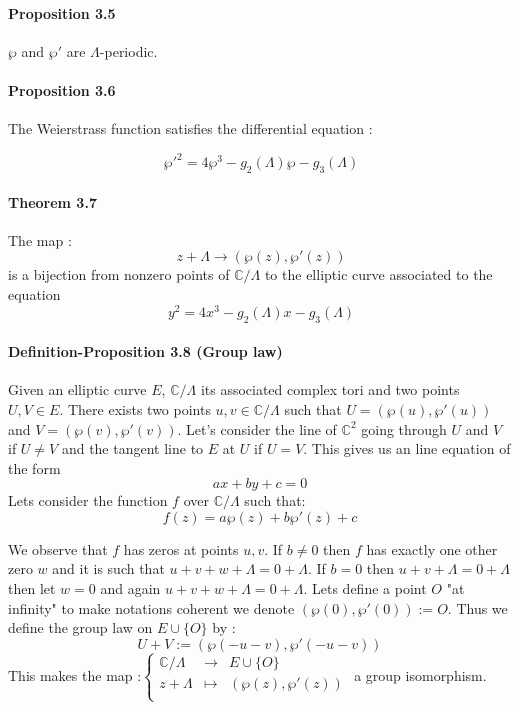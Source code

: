 \documentclass[letterpaper,10pt]{article}
\begin{document}
\paragraph{Proposition 3.5} $\wp$ and $\wp'$ are $\Lambda$-periodic.

\paragraph{Proposition 3.6} The Weierstrass function satisfies the differential equation : 

\[\ \wp'^2 = 4\wp^3 - g_2(\Lambda)\wp - g_3(\Lambda) \]

\paragraph{Theorem 3.7} The map : \[\ z + \Lambda \to (\wp(z),\wp'(z)) \]
is a bijection from nonzero points of $\mathbb{C} / \Lambda$ to the elliptic curve associated to the equation \[\ y^2 = 4x^3 - g_2(\Lambda)x - g_3(\Lambda) \]

\paragraph{Definition-Proposition 3.8 (Group law)} Given an elliptic curve $E$, $\mathbb{C}/\Lambda$ its associated complex tori and two points $U,V \in E$. There exists
two points $u,v\in\mathbb{C}/\Lambda $ such that $U=(\wp(u),\wp'(u))$ and $ V = (\wp(v),\wp'(v))$. Let's consider the line of $\mathbb{C}^2$ going 
through $U$ and $V$ if $U \neq V$ and the tangent line to $E$ at $U$ if $U=V$. This gives us an line equation of the form \[ ax+ by + c = 0  \]
Lets consider the function $f$ over $\mathbb{C}/\Lambda$ such that: \[ f(z) = a\wp(z) + b\wp'(z) + c \]

We observe that $f$ has zeros at points $u,v$.
If $ b \neq 0$ then $f$ has exactly one other zero $w$ and it is such that  $u + v + w + \Lambda = 0 + \Lambda$.
If $b = 0$ then $u + v + \Lambda = 0 + \Lambda$ then let $w = 0$ and again $u + v + w + \Lambda = 0 + \Lambda$.
Lets define a point $O$ "at infinity" to make notations coherent we denote $(\wp(0),\wp'(0)) := O$.
Thus we define the group law on $E\cup\{O\}$ by : \[ U + V := (\wp(-u - v),\wp'(-u -v)) \]
This makes the map :$  \left\{ \begin{array}{rcl} \mathbb{C}/\Lambda & \longrightarrow & E\cup \{O\} \\
  z + \Lambda & \longmapsto & (\wp(z),\wp'(z)) \\ \end{array} \right. $ a group isomorphism.
\end{document}

